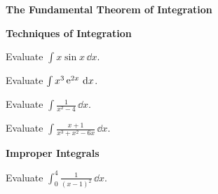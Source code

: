 \begin{large}
  \noindent
  \textbf{The Fundamental Theorem of Integration}
\end{large}


\begin{large}
  \noindent
  \textbf{Techniques of Integration}
\end{large}


\begin{Exercise}
  \label{exercise int x sin x}
  Evaluate $\int x \sin x \,\dd x$.

\end{Exercise}



\begin{Exercise}
  \label{exercise int x3 e2x}
  Evaluate $\int x^3 \mathop{\mathrm{e}}\nolimits^{2x} \,\mathrm{d} x$.

\end{Exercise}




\begin{Exercise}
  \label{exercise int 1 / x2-4}
  Evaluate $\int \frac{1}{x^2-4}\,\dd x$.

\end{Exercise}





\begin{Exercise}
  \label{exercise int x+1 / x3+x2-6x}
  Evaluate $\int \frac{x+1}{x^3+x^2-6x} \,\dd x$.

\end{Exercise}







\begin{large}
  \noindent
  \textbf{Improper Integrals}
\end{large}



\begin{Exercise}
  \label{exercise int 0 4 1 / (x-1)2}
  Evaluate $\int_0^4 \frac{1}{(x-1)^2} \,\dd x$.

\end{Exercise}





